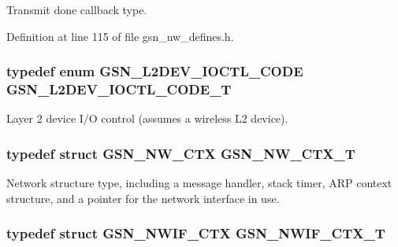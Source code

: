 Transmit done callback type. 



Definition at line 115 of file gsn\_\-nw\_\-defines.h.

\hypertarget{a00670_ga462b6ae25d126945eeb2bc9743ca3288}{
\subsubsection[{GSN\_\-L2DEV\_\-IOCTL\_\-CODE\_\-T}]{\setlength{\rightskip}{0pt plus 5cm}typedef enum {\bf GSN\_\-L2DEV\_\-IOCTL\_\-CODE}  {\bf GSN\_\-L2DEV\_\-IOCTL\_\-CODE\_\-T}}}
\label{a00670_ga462b6ae25d126945eeb2bc9743ca3288}


Layer 2 device I/O control (assumes a wireless L2 device). 

\hypertarget{a00670_ga086f6dd63b1ad2f2008312cc8c24b606}{
\subsubsection[{GSN\_\-NW\_\-CTX\_\-T}]{\setlength{\rightskip}{0pt plus 5cm}typedef struct {\bf GSN\_\-NW\_\-CTX}  {\bf GSN\_\-NW\_\-CTX\_\-T}}}
\label{a00670_ga086f6dd63b1ad2f2008312cc8c24b606}


Network structure type, including a message handler, stack timer, ARP context structure, and a pointer for the network interface in use. 

\hypertarget{a00670_ga47d94474618770f1d7c6ef6b783b9d24}{
\subsubsection[{GSN\_\-NWIF\_\-CTX\_\-T}]{\setlength{\rightskip}{0pt plus 5cm}typedef struct {\bf GSN\_\-NWIF\_\-CTX}  {\bf GSN\_\-NWIF\_\-CTX\_\-T}}}
\label{a00670_ga47d94474618770f1d7c6ef6b783b9d24}


